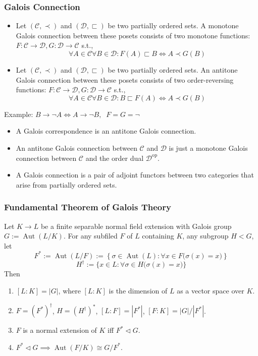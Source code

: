 \documentclass[UTF8,aspectratio=43,11pt,colorlinks,compress,openany]{beamer}%
\begin{document}
\begin{frame}\frametitle{Galois Connection}
\setlength\abovedisplayskip{0pt}
\setlength\belowdisplayskip{0pt}
\begin{definition}
\begin{itemize}
	\item Let $(\mathcal{C},\prec)$ and $(\mathcal{D},\sqsubset)$ be two partially ordered sets. A monotone Galois connection between these posets consists of two monotone functions: $F:\mathcal{C}\to\mathcal{D}, G:\mathcal{D}\to\mathcal{C}$ s.t.,
\[\forall A\in\mathcal{C}\forall B\in\mathcal{D}: F(A)\sqsubset B\iff A\prec G(B)\]
	\item Let $(\mathcal{C},\prec)$ and $(\mathcal{D},\sqsubset)$ be two partially ordered sets. An antitone Galois connection between these posets consists of two order-reversing functions: $F:\mathcal{C}\to\mathcal{D}, G:\mathcal{D}\to\mathcal{C}$ s.t.,
\[\forall A\in\mathcal{C}\forall B\in\mathcal{D}: B\sqsubset F(A)\iff A\prec G(B)\]
\end{itemize}
\end{definition}
Example: $B\to\neg A\iff A\to\neg B,\;\;F=G=\neg$
\begin{itemize}
	\item A Galois correspondence is an antitone Galois connection.
	\item An antitone Galois connection between $\mathcal{C}$ and $\mathcal{D}$ is just a monotone Galois connection between $\mathcal{C}$ and the order dual $\mathcal{D}^{\mathrm{op}}$.
	\item A Galois connection is a pair of adjoint functors between two categories that arise from partially ordered sets.
\end{itemize}
\end{frame}

\begin{frame}\frametitle{Fundamental Theorem of Galois Theory}
\begin{theorem}
Let $K\to L$ be a finite separable normal field extension with Galois group $G:=\operatorname{Aut}(L/K)$. For any subfiled $F$ of $L$ containing $K$, any subgroup $H<G$, let
\[F^*:=\operatorname{Aut}(L/F):=\left\{\sigma\in\operatorname{Aut}(L):\forall x\in F\big(\sigma(x)=x\big)\right\}\]
\[H^\dagger:=\big\{x\in L:\forall\sigma\in H\big(\sigma(x)=x\big)\big\}\]
Then
\begin{enumerate}
	\item $[L:K]=|G|$, where $[L:K]$ is the dimension of $L$ as a vector space over $K$.
	\item $F=(F^*)^\dagger$, $H=(H^\dagger)^*$, $[L:F]=|F^*|$, $[F:K]=|G|/|F^*|$.
	\item $F$ is a normal extension of $K$ iff $F^*\lhd G$.
	\item $F^*\lhd G\implies \operatorname{Aut}(F/K)\cong G/F^*$.
\end{enumerate}
\end{theorem}
\end{frame}
\end{document}
